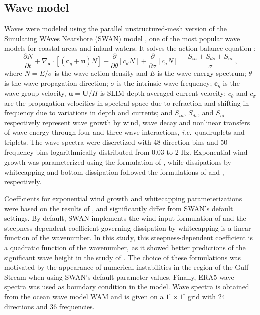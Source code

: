 \documentclass[preprint,12pt,authoryear]{elsarticle}
\newcommand{\ie}{{\it i.e.}\ }
\begin{document}
\subsection{Wave model}
Waves were modeled using the parallel unstructured-mesh version of the Simulating WAves Nearshore (SWAN) model \citep{booij1999third}, one of the most popular wave models for coastal areas and inland waters. It solves the action balance equation \citep{mei1989applied}:
\begin{equation}
    \dfrac{\partial N}{\partial t} + \nabla_\mathbf{x}\cdot[(\mathbf{c}_g+\mathbf{u})N] + \dfrac{\partial }{\partial \theta}[c_\theta N] + \dfrac{\partial}{\partial \sigma}[c_\sigma N] = \dfrac{S_{in}+S_{ds}+S_{nl}}{\sigma}~, \label{eq:swan}
\end{equation}
where $N=E/\sigma$ is the wave action density and $E$ is the wave energy spectrum; $\theta$ is the wave propagation direction; $\sigma$ is the intrinsic wave frequency; $\mathbf{c}_g$ is the wave group velocity, $\mathbf{u}=\mathbf{U}/H$ is SLIM depth-averaged current velocity; $c_\theta$ and $c_\sigma$ are the propagation velocities in spectral space due to refraction and shifting in frequency due to variations in depth and currents; and $S_{in}$, $S_{ds}$, and $S_{nl}$ respectively represent wave growth by wind, wave decay and nonlinear transfers of wave energy through four and three-wave interactions, \ie quadruplets and triplets. The wave spectra were discretized with 48 direction bins and 50 frequency bins logarithmically distributed from 0.03 to 2 Hz. Exponential wind growth was parameterized using the formulation of \cite{janssen1991quasi}, while dissipations by whitecapping and bottom dissipation followed the formulations of \cite{komen1984existence} and \cite{madsen1989spectral}, respectively.

Coefficients for exponential wind growth and whitecapping parameterizations were based on the results of \cite{siadatmousavi2011evaluation}, and significantly differ from SWAN's default settings. By default, SWAN implements the wind input formulation of \cite{komen1984existence} and the steepness-dependent coefficient governing dissipation by whitecapping is a linear function of the wavenumber. In this study, this steepness-dependent coefficient is a quadratic function of the wavenumber, as it showed better predictions of the significant wave height in the study of \cite{siadatmousavi2011evaluation}. The choice of these formulations was motivated by the appearance of numerical instabilities in the region of the Gulf Stream when using SWAN's default parameter values. Finally, ERA5 wave spectra was used as boundary condition in the model. Wave spectra is obtained from the ocean wave model WAM and is given on a $1^\circ \times 1^\circ$ grid with 24 directions and 36 frequencies.
\end{document}
